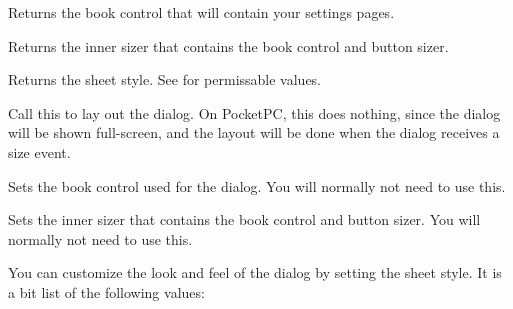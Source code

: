 \label{wxpropertysheetdialoggetbookctrl}


Returns the book control that will contain your settings pages.

\label{wxpropertysheetdialoggetinnersizer}


Returns the inner sizer that contains the book control and button sizer.

\label{wxpropertysheetdialoggetsheetstyle}


Returns the sheet style. See  for
permissable values.

\label{wxpropertysheetdialoglayoutdialog}


Call this to lay out the dialog. On PocketPC, this does nothing, since the dialog will be shown
full-screen, and the layout will be done when the dialog receives a size event.

\label{wxpropertysheetdialogsetbookctrl}


Sets the book control used for the dialog. You will normally not need to use this.

\label{wxpropertysheetdialogsetinnersizer}


Sets the inner sizer that contains the book control and button sizer. You will normally not need to use this.

\label{wxpropertysheetdialogsetsheetstyle}


You can customize the look and feel of the dialog by setting the sheet style. It is
a bit list of the following values:


